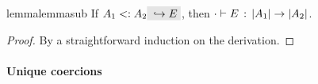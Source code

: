 
\begin{restatable}{lemma}{lemmasub}
  \label{lemma:sub}
  If $ A_1 \subtype A_2 \yields E $, then $ \cdot \vdash E \ \!:\! \ \lvert A_1 \rvert \to \lvert A_2 \rvert $.
\end{restatable}

\begin{proof}
  By a straightforward induction on the derivation.
\end{proof}




\paragraph{Unique coercions}

